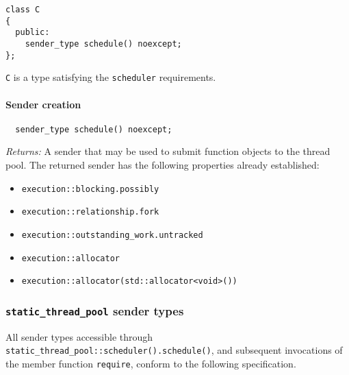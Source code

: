 \documentclass[a4paper,12pt,notitlepage,twoside,openright]{article}
\begin{document}
\begin{verbatim}
class C
{
  public:
    sender_type schedule() noexcept;
};
\end{verbatim}

\texttt{C} is a type satisfying the
\texttt{scheduler} requirements.

\hypertarget{sender-creation}{%
\paragraph{Sender creation}\label{sender-creation}}

\begin{verbatim}
  sender_type schedule() noexcept;
\end{verbatim}

\emph{Returns:} A sender that may be used to submit function objects to
the thread pool. The returned sender has the following properties
already established:

\begin{itemize}

\item
  \texttt{execution::blocking.possibly}
\item
  \texttt{execution::relationship.fork}
\item
  \texttt{execution::outstanding_work.untracked}
\item
  \texttt{execution::allocator}
\item
  \texttt{execution::allocator(std::allocator<void>())}
\end{itemize}

\hypertarget{static_thread_pool-sender-types}{%
\subsubsection{\texorpdfstring{\texttt{static_thread_pool}
sender types}{ sender types}}\label{static_thread_pool-sender-types}}

All sender types accessible through
\texttt{static_thread_pool::scheduler().schedule()}, and
subsequent invocations of the member function
\texttt{require}, conform to the following specification.
\end{document}
